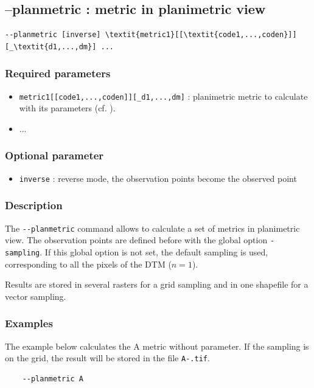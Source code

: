 \documentclass{report}
\begin{document}
\subsection{--planmetric : metric in planimetric view}

\begin{Verbatim}[commandchars=\\\{\}]
--planmetric [inverse] \textit{metric1}[[\textit{code1,...,coden}]][_\textit{d1,...,dm}] ...
\end{Verbatim}

\subsubsection{Required parameters}
\begin{itemize}
	\item \verb|metric1[[code1,...,coden]][_d1,...,dm]| : planimetric metric to calculate with its parameters (cf. ).
	\item ...
\end{itemize}

\subsubsection{Optional parameter}
\begin{itemize}
	\item \verb|inverse| : reverse mode, the observation points become the observed point
\end{itemize}

\subsubsection{Description}
The \verb|--planmetric| command allows to calculate a set of metrics in planimetric view.
The observation points are defined before with the global option \verb|-sampling|. 
If this global option is not set, the default sampling is used, corresponding to all the pixels of the DTM ($n=1$).

Results are stored in several rasters for a grid sampling and in one shapefile for a vector sampling.

\subsubsection{Examples}
The example below calculates the A metric without parameter. If the sampling is on the grid, the result will be stored in the file \verb|A-.tif|.
\begin{Verbatim}
	--planmetric A
\end{Verbatim}
\end{document}
